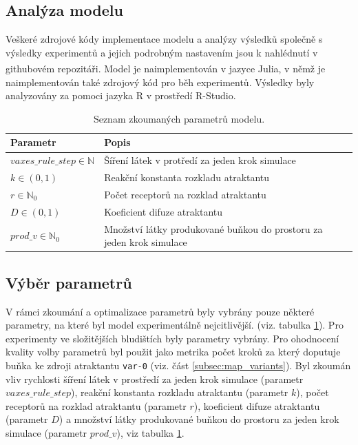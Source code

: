 \documentclass[10pt,a4paper,twocolumn]{article}
\begin{document}
\subsection{Analýza modelu}

Veškeré zdrojové kódy implementace modelu a analýzy výsledků společně s
výsledky experimentů a jejich podrobným nastavením jsou k nahlédnutí v 
githubovém repozitáři\textsuperscript{\cite{github_repo}}.
Model je 
naimplementován v jazyce Julia, v němž je naimplementován
také zdrojový kód pro běh experimentů.
Výsledky byly analyzovány za pomoci jazyka R v prostředí 
R-Studio.

\begin{table}[t]
  \centering %
  \begin{tabular}{l p{4cm}}
  \toprule
  Parametr & Popis \\
  \midrule
    $vaxes\_rule\_step \in \mathbb{N}$ & Šíření látek v protředí za jeden krok simulace
    \\ 
    $k \in (0, 1)$ & Reakční konstanta rozkladu atraktantu \\
    $r \in \mathbb{N}_0$ & Počet receptorů na rozklad atraktantu\\
    $D \in (0, 1)$ & Koeficient difuze atraktantu\\
    $prod\_v \in \mathbb{N}_0$ & Množství látky produkované buňkou do prostoru za jeden krok simulace \\
  \bottomrule
  \end{tabular}
  \caption{Seznam zkoumaných parametrů modelu.} \label{table:parametry} 
\end{table}

\subsection{Výběr parametrů}
\label{subsec:parameter_choice}
V rámci zkoumání a optimalizace parametrů byly vybrány pouze některé parametry, na které byl model experimentálně nejcitlivější.
(viz. tabulka \ref{table:parametry}). Pro experimenty ve složitějších bludištích byly parametry vybrány. Pro ohodnocení kvality volby
parametrů byl použit jako metrika počet kroků za který doputuje buňka ke zdroji atraktantu \texttt{var-0} (viz. část \ref{subsec:map_variants}). 
Byl zkoumán vliv rychlosti šíření látek v prostředí za jeden krok simulace (parametr $vaxes\_rule\_step$), 
reakční konstanta rozkladu atraktantu (parametr $k$), počet receptorů na rozklad atraktantu (parametr $r$), koeficient difuze atraktantu (parametr $D$) a množství látky produkované buňkou do prostoru za jeden krok simulace (parametr $prod\_v$), viz tabulka \ref{table:parametry}. 
\end{document}

